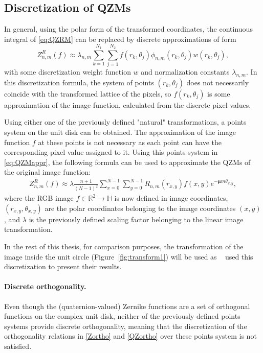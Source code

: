 \subsection{Discretization of QZMs}
In general, using the polar form of the transformed coordinates, the continuous integral of \eqref{eq:QZRM} can be replaced by discrete approximations of form
\begin{equation}\label{eq:QZMappr}
	Z_{n,m}^R(f) \approx \lambda_{n,m} \sum_{k=1}^{N_1} \sum_{j=1}^{N_2} f(r_k,\theta_j) \phi_{n,m}(r_k,\theta_j) w(r_k,\theta_j),
\end{equation}
with some discretization weight function $w$ and normalization constants $\lambda_{n,m}$. In this discretization formula, the system of points $(r_k,\theta_j)$ does not necessarily coincide with the transformed lattice of the pixels, so $f(r_k,\theta_j)$ is some approximation of the image function, calculated from the discrete pixel values.


Using either one of the previously defined "natural" transformations, a points system on the unit disk can be obtained. The approximation of the image function $f$ at these points is not necessary as each point can have the corresponding pixel value assigned to it. Using this points system in \eqref{eq:QZMappr}, the following formula can be used to approximate the QZMs of the original image function:
\begin{gather*}
    Z_{n,m}^R(f) \approx \lambda\frac{n + 1}{(N - 1)^2}\sum_{x = 0}^{N-1}\sum_{y = 0}^{N-1}R_{n,m}(r_{x,y})f(x,y)e^{-\bm{\mu}m\theta_{x,y}},
\end{gather*}
where the RGB image $f \in \mathds{R}^2 \rightarrow \mathds{H}$ is now defined in image coordinates, $(r_{x,y},\theta_{x,y})$ are the polar coordinates belonging to the image coordinates $(x,y)$, and $\lambda$ is the previously defined scaling factor belonging to the linear image transformation.

In the rest of this thesis, for comparison purposes, the transformation of the image inside the unit circle (Figure~\ref{fig:transform1}) will be used as \citeauthor{qzmi}~\cite{qzmi} used this discretization to present their results.

\paragraph{Discrete orthogonality.}
Even though the (quaternion-valued) Zernike functions are a set of orthogonal functions on the complex unit disk, neither of the previously defined points systems provide discrete orthogonality, meaning that the discretization of the orthogonality relations in \eqref{Zortho} and \eqref{QZortho} over these points system is not satisfied.


